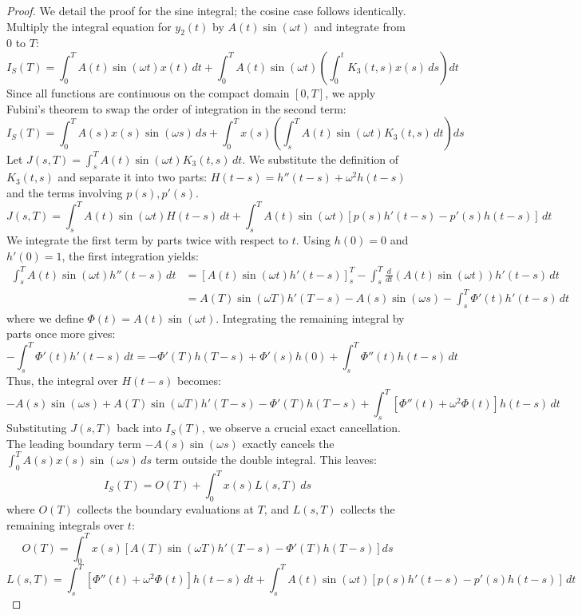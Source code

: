 \documentclass[10pt,reqno]{amsart}
\theoremstyle{definition}
\begin{document}
	\begin{proof}
		We detail the proof for the sine integral; the cosine case follows identically. Multiply the integral equation for $y_2(t)$ by $A(t)\sin(\omega t)$ and integrate from $0$ to $T$:
		\[ I_S(T) = \int_0^T A(t)\sin(\omega t) x(t)\,dt + \int_0^T A(t)\sin(\omega t) \left( \int_0^t K_3(t, s) x(s) \, ds \right) dt \]
		Since all functions are continuous on the compact domain $[0, T]$, we apply Fubini's theorem to swap the order of integration in the second term:
		\[ I_S(T) = \int_0^T A(s) x(s) \sin(\omega s)\,ds + \int_0^T x(s) \left( \int_s^T A(t)\sin(\omega t) K_3(t,s)\,dt \right) ds \]
		Let $J(s,T) = \int_s^T A(t)\sin(\omega t) K_3(t,s)\,dt$. We substitute the definition of $K_3(t,s)$ and separate it into two parts: $H(t-s) = h''(t-s) + \omega^2 h(t-s)$ and the terms involving $p(s), p'(s)$. 
		\[ J(s,T) = \int_s^T A(t)\sin(\omega t) H(t-s)\,dt + \int_s^T A(t)\sin(\omega t) [p(s)h'(t-s) - p'(s)h(t-s)]\,dt \]
		We integrate the first term by parts twice with respect to $t$. Using $h(0) = 0$ and $h'(0) = 1$, the first integration yields:
		\begin{align*}
			\int_s^T A(t)\sin(\omega t) h''(t-s)\,dt &= \left[ A(t)\sin(\omega t)h'(t-s) \right]_s^T - \int_s^T \frac{d}{dt}(A(t)\sin(\omega t)) h'(t-s)\,dt \\
			&= A(T)\sin(\omega T)h'(T-s) - A(s)\sin(\omega s) - \int_s^T \Phi'(t) h'(t-s)\,dt
		\end{align*}
		where we define $\Phi(t) = A(t)\sin(\omega t)$. Integrating the remaining integral by parts once more gives:
		\[ - \int_s^T \Phi'(t) h'(t-s)\,dt = -\Phi'(T)h(T-s) + \Phi'(s)h(0) + \int_s^T \Phi''(t)h(t-s)\,dt \]
		Thus, the integral over $H(t-s)$ becomes:
		\[ -A(s)\sin(\omega s) + A(T)\sin(\omega T)h'(T-s) - \Phi'(T)h(T-s) + \int_s^T [\Phi''(t) + \omega^2 \Phi(t)] h(t-s)\,dt \]
		Substituting $J(s,T)$ back into $I_S(T)$, we observe a crucial exact cancellation. The leading boundary term $-A(s)\sin(\omega s)$ exactly cancels the $\int_0^T A(s)x(s)\sin(\omega s)\,ds$ term outside the double integral. This leaves:
		\[ I_S(T) = O(T) + \int_0^T x(s) L(s,T)\,ds \]
		where $O(T)$ collects the boundary evaluations at $T$, and $L(s,T)$ collects the remaining integrals over $t$:
		\[ O(T) = \int_0^T x(s) \left[ A(T)\sin(\omega T)h'(T-s) - \Phi'(T)h(T-s) \right] ds \]
		\[ L(s,T) = \int_s^T [\Phi''(t) + \omega^2 \Phi(t)] h(t-s)\,dt + \int_s^T A(t)\sin(\omega t) [p(s)h'(t-s) - p'(s)h(t-s)]\,dt \]
		

\end{proof}
\end{document}
